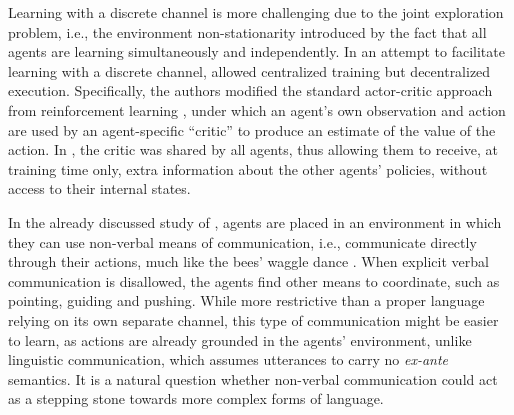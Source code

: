 
Learning with a discrete channel is more challenging due to the joint exploration problem, i.e., the environment non-stationarity introduced by the fact that all agents are learning  simultaneously and independently.  In an attempt to facilitate learning with a discrete channel,   allowed centralized training but decentralized execution. Specifically, the authors modified the standard actor-critic approach from reinforcement learning \cite{Sutton:Barto:1998}, under which an agent's own observation and action are used by an agent-specific ``critic'' to produce an estimate of the value of the action. In , the critic was shared by all agents,  thus allowing them to receive, at training time only, extra information about the other agents' policies, without access to their internal states.  

In the already discussed study of , agents are placed in an environment in
which they can use non-verbal means of communication, i.e., communicate
directly through their actions, much like the bees' waggle dance
\cite{VonFrisch:1967}. When explicit verbal
communication is disallowed, the agents find other means to
coordinate, such as pointing, guiding and pushing. While more
restrictive than a proper language relying on its own separate channel, this
type of communication might be easier to learn, as actions are already
grounded in the agents' environment, unlike linguistic communication,
which assumes utterances to carry no \emph{ex-ante} semantics. It is a natural question whether non-verbal communication could act as a
stepping stone towards more complex forms of language.

